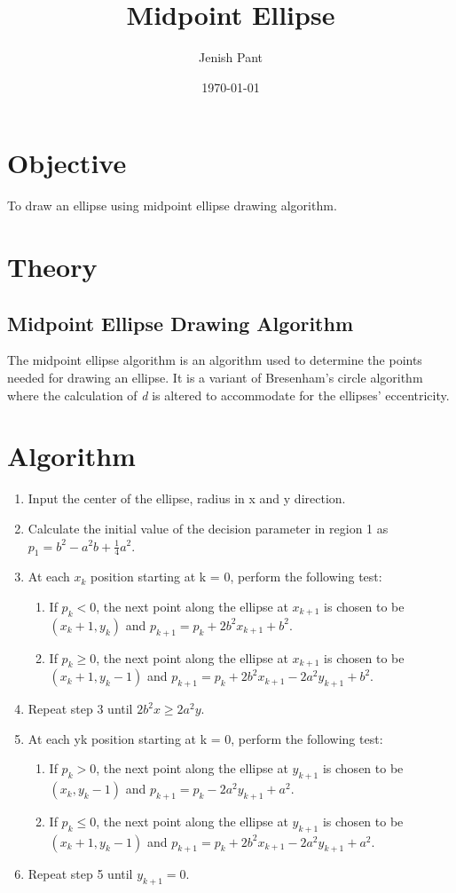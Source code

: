 \documentclass[12pt]{article}
\begin{document}
	\title{Midpoint Ellipse}
	\author{Jenish Pant}
	\date{\today}
	\maketitle

	\section{Objective}
	To draw an ellipse using midpoint ellipse drawing algorithm.
	\section{Theory}
	
	\subsection{Midpoint Ellipse Drawing Algorithm}
	The midpoint ellipse algorithm is an algorithm used to determine the points needed for drawing an ellipse. It is a variant of Bresenham's circle algorithm where the calculation of \textit{d} is altered to accommodate for the ellipses' eccentricity.

	\section{Algorithm}
	\begin{enumerate}
		\item Input the center of the ellipse, radius in x and y direction.
		\item Calculate the initial value of the decision parameter in region 1 as $p_1 = b^2 - a^2b + \frac{1}{4}a^2$.
		\item At each $x_k$ position starting at k = 0, perform the following test:
		\begin{enumerate}
			\item If $p_k < 0$, the next point along the ellipse at $x_{k+1}$ is chosen to be $(x_k + 1, y_k)$ and $p_{k+1} = p_k + 2b^2x_{k+1} + b^2$.
			\item If $p_k \geq 0$, the next point along the ellipse at $x_{k+1}$ is chosen to be $(x_k + 1, y_k - 1)$ and $p_{k+1} = p_k + 2b^2x_{k+1} - 2a^2y_{k+1} + b^2$.
		\end{enumerate}
		\item Repeat step 3 until $2b^2x \geq 2a^2y$.
		\item At each yk position starting at k = 0, perform the following test:
		\begin{enumerate}
			\item If $p_k > 0$, the next point along the ellipse at $y_{k+1}$ is chosen to be $(x_k, y_k - 1)$ and $p_{k+1} = p_k - 2a^2y_{k+1} + a^2$.
			\item If $p_k \leq 0$, the next point along the ellipse at $y_{k+1}$ is chosen to be $(x_k + 1, y_k - 1)$ and $p_{k+1} = p_k + 2b^2x_{k+1} - 2a^2y_{k+1} + a^2$.
		\end{enumerate}
		\item Repeat step 5 until $y_{k+1} = 0$.
	\end{enumerate}
\end{document}
